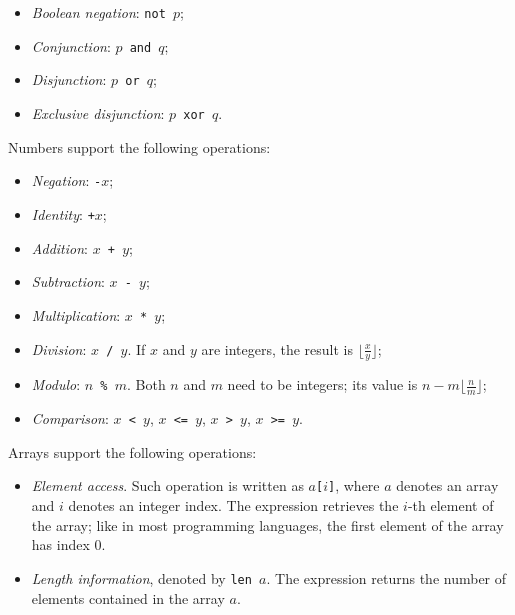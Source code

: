 \documentclass[11pt, american, draft]{PhdThesis}
\begin{document}
  \begin{itemize}[noitemsep,topsep=0pt]
    \item \emph{Boolean negation}: \mbox{\texttt{not $p$}};
    \item \emph{Conjunction}: \mbox{\texttt{$p$ and $q$}};
    \item \emph{Disjunction}: \mbox{\texttt{$p$ or $q$}};
    \item \emph{Exclusive disjunction}: \mbox{\texttt{$p$ xor $q$}}.
  \end{itemize}

  Numbers support the following operations:

  \begin{itemize}[noitemsep,topsep=0pt]
    \item \emph{Negation}: \mbox{\texttt{-$x$}};

    \item \emph{Identity}: \mbox{\texttt{+$x$}};

    \item \emph{Addition}: \mbox{\texttt{$x$ + $y$}};

    \item \emph{Subtraction}: \mbox{\texttt{$x$ - $y$}};

    \item \emph{Multiplication}: \mbox{\texttt{$x$ * $y$}};

    \item \emph{Division}: \mbox{\texttt{$x$ / $y$}}. If $x$ and $y$ are integers, the result is
          \mbox{$\lfloor\frac{x}{y}\rfloor$};

    \item \emph{Modulo}: \mbox{\texttt{$n$ \% $m$}}. Both $n$ and $m$ need to be integers; its value
          is \mbox{$n - m \lfloor\frac{n}{m}\rfloor$};

    \item \emph{Comparison}: \mbox{\texttt{$x$ < $y$}}, \mbox{\texttt{$x$ <= $y$}},
          \mbox{\texttt{$x$ > $y$}}, \mbox{\texttt{$x$ >= $y$}}.
  \end{itemize}

  Arrays support the following operations:

  \begin{itemize}[noitemsep,topsep=0pt]
    \item \emph{Element access}. Such operation is written as \mbox{\texttt{$a$[$i$]}}, where $a$
          denotes an array and $i$ denotes an integer index. The expression retrieves the $i$-th
          element of the array; like in most programming languages, the first element of the array
          has index $0$.

    \item \emph{Length information}, denoted by \mbox{\texttt{len $a$}}. The expression returns the
          number of elements contained in the array $a$.
  \end{itemize}
\end{document}
